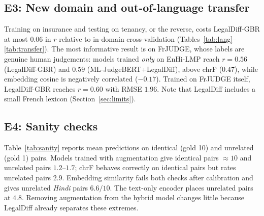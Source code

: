 \subsection{E3: New domain and out-of-language transfer}
Training on insurance and testing on tenancy, or the reverse, costs LegalDiff-GBR at most $0.06$ in $r$ relative to in-domain cross-validation (Tables~\ref{tab:lang}--\ref{tab:transfer}). The most informative result is on FrJUDGE, whose labels are genuine human judgements: models trained \emph{only} on EnHi-LMP reach $r=0.56$ (LegalDiff-GBR) and $0.59$ (ML-JudgeBERT+LegalDiff), above chrF ($0.47$), while embedding cosine is negatively correlated ($-0.17$). Trained on FrJUDGE itself, LegalDiff-GBR reaches $r=0.60$ with RMSE $1.96$. Note that LegalDiff includes a small French lexicon (Section~\ref{sec:limits}).

\subsection{E4: Sanity checks}
Table~\ref{tab:sanity} reports mean predictions on identical (gold 10) and unrelated (gold 1) pairs. Models trained with augmentation give identical pairs $\approx10$ and unrelated pairs $1.2$--$1.7$; chrF behaves correctly on identical pairs but rates unrelated pairs $2.9$. Embedding similarity fails both checks after calibration and gives unrelated \emph{Hindi} pairs $6.6/10$. The text-only encoder places unrelated pairs at $4.8$. Removing augmentation from the hybrid model changes little because LegalDiff already separates these extremes.

\begin{table}[t]
\caption{E4: Sanity checks (mean $\hat{y}$; share within tolerance)}\label{tab:sanity}
\centering\footnotesize\setlength{\tabcolsep}{3pt}
\end{table}

